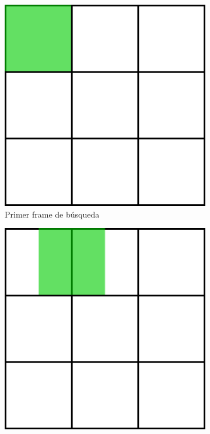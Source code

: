 \begin{figure}
	\centering
	\begin{subfigure}[b]{0.25\textwidth}
		\includegraphics[width=\textwidth]{img/grilla/primercuadrante.png}
		\caption{Primer frame de búsqueda}
		\label{frames_solapados_1}
	\end{subfigure}
	\quad
	\begin{subfigure}[b]{0.25\textwidth}
		\includegraphics[width=\textwidth]{img/grilla/segundocuadrante.png}

\end{subfigure}
\end{figure}
